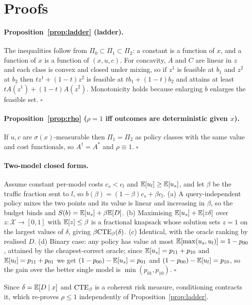 \section{Proofs}\label{app:proofs}

\paragraph{Proposition~\ref{prop:ladder} (ladder).}
The inequalities follow from $\Pi_0\subset\Pi_1\subset\Pi_2$: a constant is a
function of $x$, and a function of $x$ is a function of $(x,u,c)$. For concavity,
$A$ and $C$ are linear in $z$ and each class is convex and closed under mixing,
so if $z^1$ is feasible at $b_1$ and $z^2$ at $b_2$ then $tz^1+(1-t)z^2$ is
feasible at $tb_1+(1-t)b_2$ and attains at least $tA(z^1)+(1-t)A(z^2)$.
Monotonicity holds because enlarging $b$ enlarges the feasible set. \hfill$\square$

\paragraph{Proposition~\ref{prop:rho} ($\rho=1$ iff outcomes are deterministic given $x$).}
If $u,c$ are $\sigma(x)$-measurable then $\Pi_1=\Pi_2$ as policy classes with the
same value and cost functionals, so $A^\dagger=A^*$ and $\rho\equiv1$.
\hfill$\square$

\paragraph{Two-model closed forms.}
Assume constant per-model costs $c_s<c_l$ and $\mathbb{E}[u_l]\ge\mathbb{E}[u_s]$, and let
$\beta$ be the traffic fraction sent to $l$, so $b(\beta)=(1-\beta)c_s+\beta c_l$.
(a) A query-independent policy mixes the two points and its value is linear and
increasing in $\beta$, so the budget binds and $S(b)=\mathbb{E}[u_s]+\beta\mathbb{E}[D]$.
(b) Maximising $\mathbb{E}[u_s]+\mathbb{E}[z\delta]$ over $z:\mathcal X\to[0,1]$ with
$\mathbb{E}[z]\le\beta$ is a fractional knapsack whose solution sets $z=1$ on the largest
values of $\delta$, giving $\beta\mathrm{CTE}_\beta(\delta)$.
(c) Identical, with the oracle ranking by realised $D$.
(d) Binary case: any policy has value at most $\mathbb{E}[\max(u_s,u_l)]=1-p_{00}$,
attained by the cheapest-correct oracle; since $\mathbb{E}[u_s]=p_{11}+p_{10}$ and
$\mathbb{E}[u_l]=p_{11}+p_{01}$ we get $(1-p_{00})-\mathbb{E}[u_s]=p_{01}$ and
$(1-p_{00})-\mathbb{E}[u_l]=p_{10}$, so the gain over the better single model is
$\min(p_{01},p_{10})$. \hfill$\square$

Since $\delta=\mathbb{E}[D\mid x]$ and $\mathrm{CTE}_\beta$ is a coherent risk measure,
conditioning contracts it, which re-proves $\rho\le1$ independently of
Proposition~\ref{prop:ladder}.

